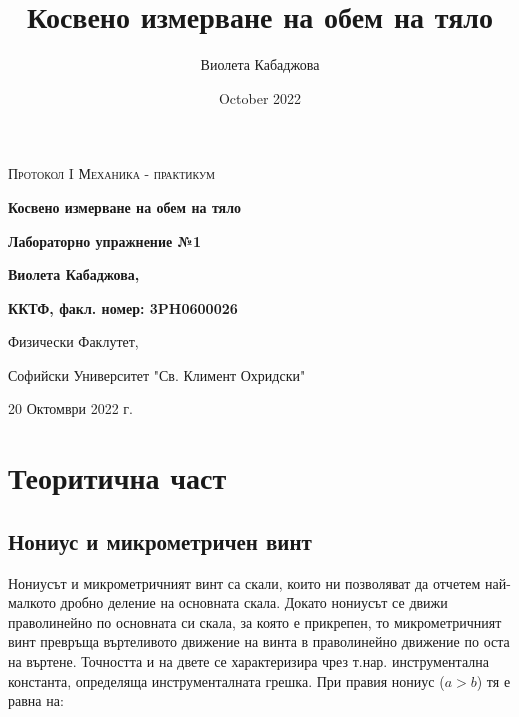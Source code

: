 \documentclass[12pt]{article}
\title{Косвено измерване на обем на тяло}
\author{Виолета Кабаджова}
\date{October 2022}
\begin{document}
\begin{titlepage}
	\flushleft
	{\scshape\Large Протокол I \hspace{2.5cm} Механика - практикум\par}
	\vspace{5cm}
	{\huge\bfseries Косвено измерване на обем на тяло\par}
	\vspace{1cm}
	{\LARGE\bfseries Лабораторно упражнение №1\par}
	\vspace{5cm}
    {\LARGE\bfseries Виолета Кабаджова, \par}
    {\large\bfseries ККТФ, факл. номер: 3PH0600026\par}
	\vspace{1cm}
	
	{\large Физически Факлутет, 
	
	Софийски Университет "Св. Климент Охридски"
	
	20 Октомври 2022 г.\par}
	
\end{titlepage}

\section{Теоритична част}

\subsection{Нониус и микрометричен винт}
Нониусът и микрометричният винт са скали, които ни позволяват да отчетем най-малкото дробно деление на основната скала. Докато нониусът се движи праволинейно по основната си скала, за която е прикрепен, то микрометричният винт превръща въртеливото движение на винта в праволинейно движение по оста на въртене. Точността и на двете се характеризира чрез т.нар. инструментална константа, определяща инструменталната грешка. При правия нониус (\begin{math}a > b\end{math}) тя е равна на:
\end{document}
